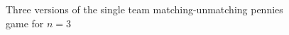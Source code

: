 \begin{figure}




\caption{Three versions of the single team matching-unmatching pennies game for $n=3$}
\label{fig:match-penny-3-die}
\end{figure}